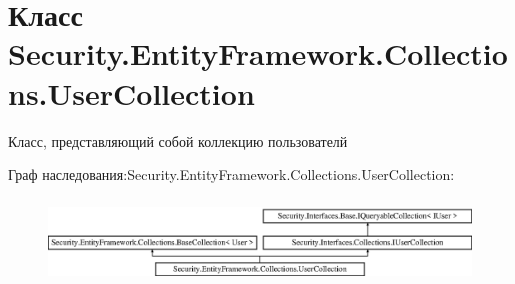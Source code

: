 \hypertarget{class_security_1_1_entity_framework_1_1_collections_1_1_user_collection}{}\section{Класс Security.\+Entity\+Framework.\+Collections.\+User\+Collection}
\label{class_security_1_1_entity_framework_1_1_collections_1_1_user_collection}


Класс, представляющий собой коллекцию пользователй  


Граф наследования\+:Security.\+Entity\+Framework.\+Collections.\+User\+Collection\+:\begin{figure}[H]
\begin{center}
\leavevmode
\includegraphics[height=2.276423cm]{dc/d09/class_security_1_1_entity_framework_1_1_collections_1_1_user_collection}
\end{center}
\end{figure}
